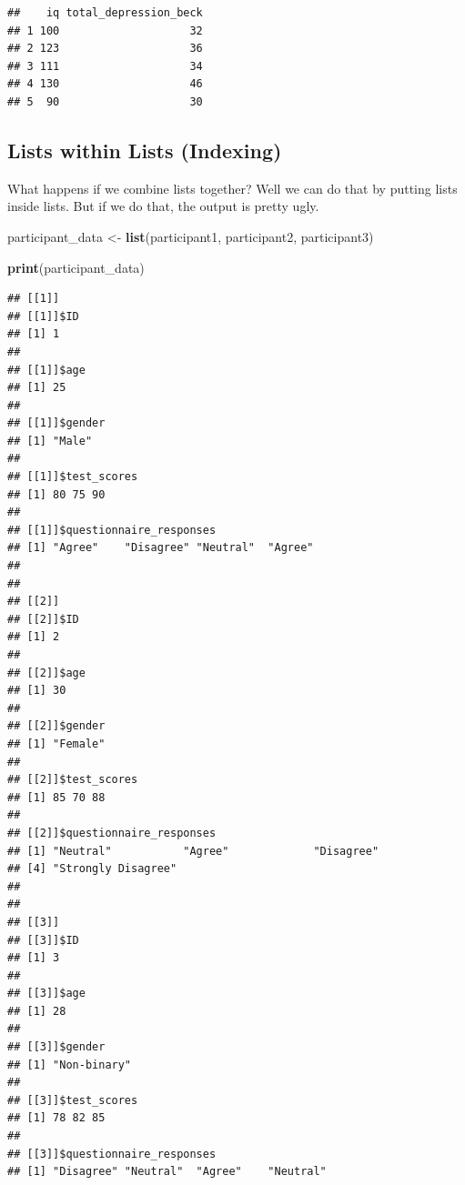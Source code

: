 \documentclass[
]{book}
\newenvironment{Shaded}{\begin{snugshade}}{\end{snugshade}}
\newcommand{\DecValTok}[1]{\textcolor[rgb]{0.00,0.00,0.81}{#1}}
\newcommand{\FunctionTok}[1]{\textcolor[rgb]{0.13,0.29,0.53}{\textbf{#1}}}
\newcommand{\NormalTok}[1]{#1}
\newcommand{\OtherTok}[1]{\textcolor[rgb]{0.56,0.35,0.01}{#1}}
\newcommand{\SpecialCharTok}[1]{\textcolor[rgb]{0.81,0.36,0.00}{\textbf{#1}}}
\newcommand{\StringTok}[1]{\textcolor[rgb]{0.31,0.60,0.02}{#1}}
\begin{document}
\begin{Shaded}
\end{Shaded}

\begin{verbatim}
##    iq total_depression_beck
## 1 100                    32
## 2 123                    36
## 3 111                    34
## 4 130                    46
## 5  90                    30
\end{verbatim}

\hypertarget{lists-within-lists-indexing}{%
\subsection{Lists within Lists (Indexing)}\label{lists-within-lists-indexing}}

What happens if we combine lists together? Well we can do that by putting lists inside lists. But if we do that, the output is pretty ugly.

\begin{Shaded}
\begin{Highlighting}[]
\NormalTok{participant\_data }\OtherTok{\textless{}{-}} \FunctionTok{list}\NormalTok{(participant1, participant2, participant3)}
 
\FunctionTok{print}\NormalTok{(participant\_data)}
\end{Highlighting}
\end{Shaded}

\begin{verbatim}
## [[1]]
## [[1]]$ID
## [1] 1
## 
## [[1]]$age
## [1] 25
## 
## [[1]]$gender
## [1] "Male"
## 
## [[1]]$test_scores
## [1] 80 75 90
## 
## [[1]]$questionnaire_responses
## [1] "Agree"    "Disagree" "Neutral"  "Agree"   
## 
## 
## [[2]]
## [[2]]$ID
## [1] 2
## 
## [[2]]$age
## [1] 30
## 
## [[2]]$gender
## [1] "Female"
## 
## [[2]]$test_scores
## [1] 85 70 88
## 
## [[2]]$questionnaire_responses
## [1] "Neutral"           "Agree"             "Disagree"         
## [4] "Strongly Disagree"
## 
## 
## [[3]]
## [[3]]$ID
## [1] 3
## 
## [[3]]$age
## [1] 28
## 
## [[3]]$gender
## [1] "Non-binary"
## 
## [[3]]$test_scores
## [1] 78 82 85
## 
## [[3]]$questionnaire_responses
## [1] "Disagree" "Neutral"  "Agree"    "Neutral"
\end{verbatim}
\end{document}
